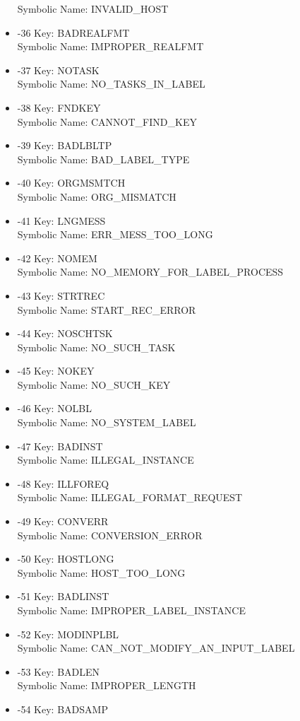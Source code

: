 \begin{itemize}
Symbolic Name: INVALID\_HOST
\item -36 Key: BADREALFMT \\
Symbolic Name: IMPROPER\_REALFMT
\item -37 Key: NOTASK \\
Symbolic Name: NO\_TASKS\_IN\_LABEL
\item -38 Key: FNDKEY \\
Symbolic Name: CANNOT\_FIND\_KEY
\item -39 Key: BADLBLTP \\
Symbolic Name: BAD\_LABEL\_TYPE
\item -40 Key: ORGMSMTCH \\
Symbolic Name: ORG\_MISMATCH
\item -41 Key: LNGMESS \\
Symbolic Name: ERR\_MESS\_TOO\_LONG
\item -42 Key: NOMEM \\
Symbolic Name: NO\_MEMORY\_FOR\_LABEL\_PROCESS
\item -43 Key: STRTREC \\
Symbolic Name: START\_REC\_ERROR
\item -44 Key: NOSCHTSK \\
Symbolic Name: NO\_SUCH\_TASK
\item -45 Key: NOKEY \\
Symbolic Name: NO\_SUCH\_KEY
\item -46 Key: NOLBL \\
Symbolic Name: NO\_SYSTEM\_LABEL
\item -47 Key: BADINST \\
Symbolic Name: ILLEGAL\_INSTANCE
\item -48 Key: ILLFOREQ \\
Symbolic Name: ILLEGAL\_FORMAT\_REQUEST
\item -49 Key: CONVERR \\
Symbolic Name: CONVERSION\_ERROR
\item -50 Key: HOSTLONG \\
Symbolic Name: HOST\_TOO\_LONG
\item -51 Key: BADLINST \\
Symbolic Name: IMPROPER\_LABEL\_INSTANCE
\item -52 Key: MODINPLBL \\
Symbolic Name: CAN\_NOT\_MODIFY\_AN\_INPUT\_LABEL
\item -53 Key: BADLEN \\
Symbolic Name: IMPROPER\_LENGTH
\item -54 Key: BADSAMP \\

\end{itemize}
